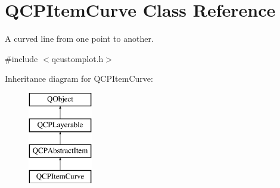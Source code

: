 \hypertarget{class_q_c_p_item_curve}{}\section{Q\+C\+P\+Item\+Curve Class Reference}
\label{class_q_c_p_item_curve}


A curved line from one point to another.  




{\ttfamily \#include $<$qcustomplot.\+h$>$}

Inheritance diagram for Q\+C\+P\+Item\+Curve\+:\begin{figure}[H]
\begin{center}
\leavevmode
\includegraphics[height=4.000000cm]{df/d63/class_q_c_p_item_curve}
\end{center}
\end{figure}
